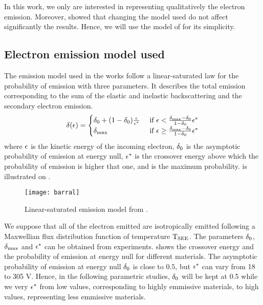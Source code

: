 In this work, we only are interested in representing qualitatively the electron emission.
Moreover, \citet{croes2017} showed that changing the model used do not affect significantly the results. 
Hence, we will use the model of \citet{barral2003a} for its simplicity.

\subsection{Electron emission model used}
\label{sec-modelused}
The emission model used in the works follow a linear-saturated law for the probability of emission with three parameters. 
It describes the total emission corresponding to the sum of the elastic and inelastic backscattering and the secondary electron emission.
\begin{equation} \label{eq-proba_barral}
  \delta (\epsilon) = 
  \begin{cases}
    \delta _0 + (1 - \delta _0) \frac{\epsilon}{\epsilon^*}   &\text{ if } \epsilon < \frac{\delta _{\rm max}  - \delta _0}{1 - \delta _0} \epsilon^*  \\
    \delta _{\rm max}  &\text{ if } \epsilon \geq \frac{\delta _{\rm max}  - \delta _0}{1 - \delta _0} \epsilon^*
  \end{cases}
\end{equation}
where $\epsilon$ is the kinetic energy of the incoming electron, $\delta _0$ is the asymptotic probability of emission at energy null, $\epsilon^*$ is the crossover energy above which the probability of emission is higher that one, and \probamax is the maximum probability.
 is illustrated on .

\begin{figure}[hbtp]
  \centering
  \texttt{[image: barral]}
  \caption{Linear-saturated emission model from \citet{barral2003a}.}
  \label{fig-modelbarral}
\end{figure}

 We suppose that all of the electron emitted are isotropically emitted following a Maxwellian flux distribution function of temperature $\mathrm{T_{SEE}}$.
 The parameters $\delta _0$,  $\delta _{\rm max} $ and $\epsilon^*$ can be obtained from experiments. 
  shows the crossover energy and the  probability of emission at energy null for different materials.
 The  asymptotic probability of emission at energy null $\delta _0$ is close to $0.5$, but $\epsilon^*$ can vary from 18 to 305 V.
 Hence, in the following parametric studies, $\delta _0$ will be kept at 0.5 while we very $\epsilon^*$ from low values, corresponding to highly emmissive materials, to high values, representing less emmissive materials.
 

